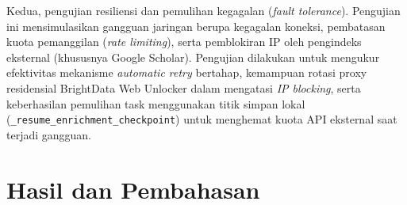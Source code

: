 \documentclass{rapidsart}
\theoremstyle{plain}
\theoremstyle{remark}
\theoremstyle{definition}
\begin{document}
\begin{sloppypar}
    Kedua, pengujian resiliensi dan pemulihan kegagalan (\textit{fault tolerance}). Pengujian ini mensimulasikan gangguan jaringan berupa kegagalan koneksi, pembatasan kuota pemanggilan (\textit{rate limiting}), serta pemblokiran IP oleh pengindeks eksternal (khususnya Google Scholar). Pengujian dilakukan untuk mengukur efektivitas mekanisme \textit{automatic retry} bertahap, kemampuan rotasi proxy residensial BrightData Web Unlocker dalam mengatasi \textit{IP blocking}, serta keberhasilan pemulihan task menggunakan titik simpan lokal (\texttt{\_resume\_enrichment\_checkpoint}) untuk menghemat kuota API eksternal saat terjadi gangguan.

\end{sloppypar}

\section{Hasil dan Pembahasan}
\end{document}
